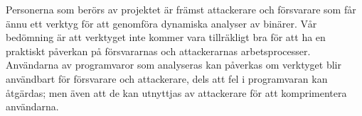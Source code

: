 
Personerna som berörs av projektet är främst attackerare och försvarare som får ännu ett verktyg för att genomföra dynamiska analyser av binärer.
Vår bedömning är att verktyget inte kommer vara tillräkligt bra för att ha en praktiskt påverkan på försvararnas och attackerarnas arbetsprocesser.
Användarna av programvaror som analyseras kan påverkas om verktyget blir användbart för försvarare och attackerare, dels att fel i programvaran kan åtgärdas; men även att de kan utnyttjas av attackerare för att komprimentera användarna.
